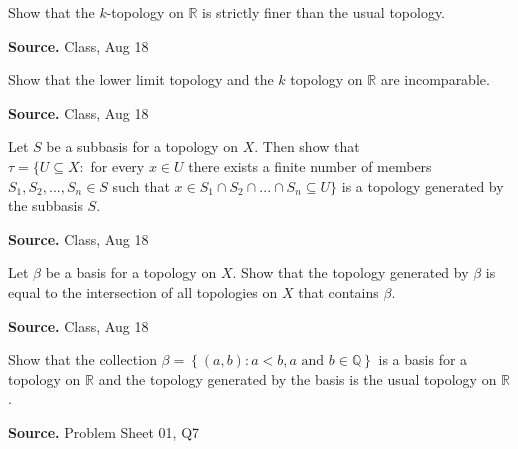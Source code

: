 \documentclass[12pt,twoside]{report}
\newenvironment*{source}{\hfill\scriptsize\textbf{Source.}\space}{\par}
\begin{document}
\begin{samepage}
\begin{ex}
Show that the $k$-topology on $\mathbb{R}$ is strictly finer than the usual topology.
\end{ex}
\begin{source}
Class, Aug 18
\end{source}
\end{samepage}

\begin{samepage}
\begin{ex}
Show that the lower limit topology and the $k$ topology on $\mathbb{R}$ are incomparable.
\end{ex}
\begin{source}
Class, Aug 18
\end{source}
\end{samepage}

\begin{samepage}
\begin{ex}
Let $S$ be a subbasis for a topology on $X$. Then show that 
\\ $\tau = \{ U \subseteq X  :  $ for every $ x \in U $ there exists a finite number of members $ S_1, S_2, ..., S_n \in S $ such that $ x \in S_1 \cap S_2 \cap ... \cap S_n \subseteq U \}$ is a topology generated by the subbasis $S$.
\end{ex}
\begin{source}
Class, Aug 18
\end{source}
\end{samepage}

\begin{samepage}
\begin{ex}
Let $\beta$ be a basis for a topology on $X$. Show that the topology generated by $\beta$ is equal to the intersection of all topologies on $X$ that contains $\beta$.
\end{ex}
\begin{source}
Class, Aug 18
\end{source}
\end{samepage}

\begin{samepage}
\begin{ex}
Show that the collection $\beta = \left\{ \left (a,b\right )  :  a < b, a \text{ and } b \in \mathbb{Q} \right\}$ is a basis for a topology on $\mathbb{R}$ and the topology generated by the basis is the usual topology on $\mathbb{R}$.
\end{ex}
\begin{source}
Problem Sheet 01, Q7
\end{source}
\end{samepage}
\end{document}
